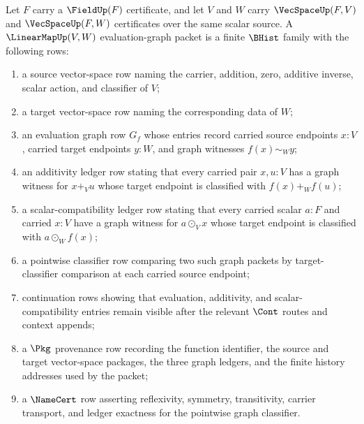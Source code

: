 \begin{definition}
\label{def:linearmap-evaluation-graph-carrier}
Let $F$ carry a $\FieldUp(F)$ certificate, and let $V$ and $W$ carry $\VecSpaceUp(F,V)$ and $\VecSpaceUp(F,W)$ certificates over the same scalar source. A $\LinearMapUp(V,W)$ evaluation-graph packet is a finite $\BHist$ family with the following rows:
\begin{enumerate}
  \item a source vector-space row naming the carrier, addition, zero, additive inverse, scalar action, and classifier of $V$;
  \item a target vector-space row naming the corresponding data of $W$;
  \item an evaluation graph row $G_f$ whose entries record carried source endpoints $x:V$, carried target endpoints $y:W$, and graph witnesses $f(x)\sim_W y$;
  \item an additivity ledger row stating that every carried pair $x,u:V$ has a graph witness for $x+_V u$ whose target endpoint is classified with $f(x)+_W f(u)$;
  \item a scalar-compatibility ledger row stating that every carried scalar $a:F$ and carried $x:V$ have a graph witness for $a\odot_V x$ whose target endpoint is classified with $a\odot_W f(x)$;
  \item a pointwise classifier row comparing two such graph packets by target-classifier comparison at each carried source endpoint;
  \item continuation rows showing that evaluation, additivity, and scalar-compatibility entries remain visible after the relevant $\Cont$ routes and context appends;
  \item a $\Pkg$ provenance row recording the function identifier, the source and target vector-space packages, the three graph ledgers, and the finite history addresses used by the packet;
  \item a $\NameCert$ row asserting reflexivity, symmetry, transitivity, carrier transport, and ledger exactness for the pointwise graph classifier.
\end{enumerate}
\end{definition}

